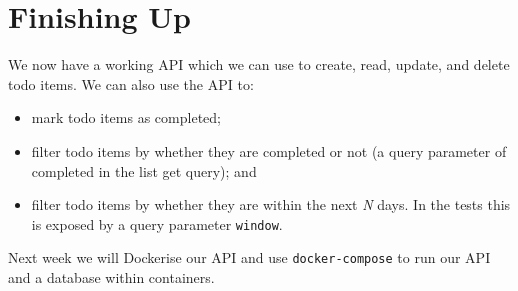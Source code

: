 \documentclass{csse4400}
\begin{document}
\section{Finishing Up}

We now have a working API which we can use to create, read, update, and delete todo items.
We can also use the API to:
\begin{itemize}
  \item mark todo items as completed;
  \item filter todo items by whether they are completed or not (a query parameter of completed in the list get query); and
  \item filter todo items by whether they are within the next \textit{N} days.
        In the tests this is exposed by a query parameter \texttt{window}.
\end{itemize}

Next week we will Dockerise our API and use \texttt{docker-compose} to run our API and a database within containers.




\end{document}
